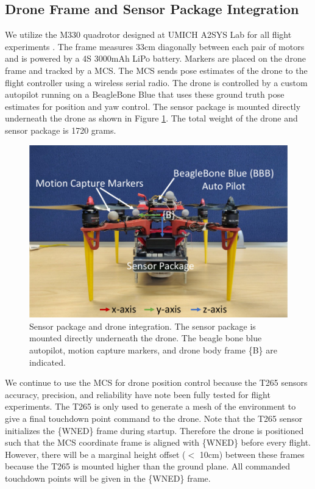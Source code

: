 \subsection{Drone Frame and Sensor Package Integration}

We utilize the M330 quadrotor designed at UMICH A2SYS Lab for all flight experiments \cite{romano_experimental_2019}. The frame measures 33cm diagonally between each pair of motors and is powered by a 4S 3000mAh LiPo battery. Markers are placed on the drone frame and tracked by a \ac{MCS}. The \ac{MCS} sends pose estimates of the drone to the flight controller using a wireless serial radio. The drone is controlled by a custom autopilot running on a BeagleBone Blue that uses these ground truth pose estimates for position and yaw control. The sensor package is mounted directly underneath the drone as shown in Figure \ref{fig:ch7_drone_frame}. The total weight of the drone and sensor package is 1720 grams.

\begin{figure}[!htb]
  \centering
  \includegraphics[page=1,clip,trim=0cm 0cm 0cm 0cm,width=.50\linewidth]{chapter_7_experiments/imgs/drone_with_sensor_package.pdf}
  \caption[Sensor package and drone integration.]{Sensor package and drone integration. The sensor package is mounted directly underneath the drone. The beagle bone blue autopilot, motion capture markers, and drone body frame \{B\} are indicated.}\label{fig:ch7_drone_frame}
\end{figure}

We continue to use the \ac{MCS} for drone position control because the T265 sensors accuracy, precision, and reliability have note been fully tested for flight experiments. The T265 is only used to generate a mesh of the environment to give a final touchdown point command to the drone. Note that the T265 sensor initializes the \{WNED\} frame during startup. Therefore the drone is positioned such that the \ac{MCS} coordinate frame is aligned with \{WNED\} before every flight. However, there will be a marginal height offset ($<$ 10cm) between these frames because the T265 is mounted higher than the ground plane. All commanded touchdown points will be given in the \{WNED\} frame.

